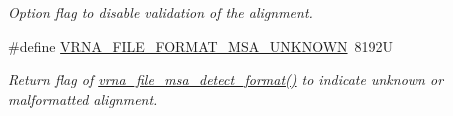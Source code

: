 \begin{DoxyCompactItemize}
\begin{DoxyCompactList}\small\item\em Option flag to disable validation of the alignment. \end{DoxyCompactList}\item 
\#define \hyperlink{group__file__utils_gabdc948f547e550125de3e7c65878400c}{V\+R\+N\+A\+\_\+\+F\+I\+L\+E\+\_\+\+F\+O\+R\+M\+A\+T\+\_\+\+M\+S\+A\+\_\+\+U\+N\+K\+N\+O\+WN}~8192U
\begin{DoxyCompactList}\small\item\em Return flag of \hyperlink{group__file__utils_gade4fa8136ebb2d0f7eb3f8b59a8658e3}{vrna\+\_\+file\+\_\+msa\+\_\+detect\+\_\+format()} to indicate unknown or malformatted alignment. \end{DoxyCompactList}\end{DoxyCompactItemize}
